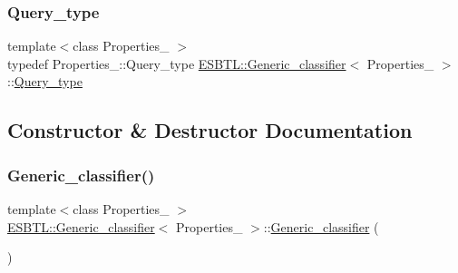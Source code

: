 \mbox{\label{structESBTL_1_1Generic__classifier_af7772b010c028daaec09d6a3f556894d}} 
\subsubsection{\texorpdfstring{Query\+\_\+type}{Query\_type}}
{\footnotesize\ttfamily template$<$class Properties\+\_\+ $>$ \\
typedef Properties\+\_\+\+::\+Query\+\_\+type \hyperlink{structESBTL_1_1Generic__classifier}{E\+S\+B\+T\+L\+::\+Generic\+\_\+classifier}$<$ Properties\+\_\+ $>$\+::\hyperlink{structESBTL_1_1Generic__classifier_af7772b010c028daaec09d6a3f556894d}{Query\+\_\+type}}



\subsection{Constructor \& Destructor Documentation}
\mbox{\label{structESBTL_1_1Generic__classifier_a5d56e509b7af3a5fe94e4e737de4eea8}} 
\subsubsection{\texorpdfstring{Generic\+\_\+classifier()}{Generic\_classifier()}\hspace{0.1cm}{\footnotesize\ttfamily [1/3]}}
{\footnotesize\ttfamily template$<$class Properties\+\_\+ $>$ \\
\hyperlink{structESBTL_1_1Generic__classifier}{E\+S\+B\+T\+L\+::\+Generic\+\_\+classifier}$<$ Properties\+\_\+ $>$\+::\hyperlink{structESBTL_1_1Generic__classifier}{Generic\+\_\+classifier} (\begin{DoxyParamCaption}{ }\end{DoxyParamCaption})\hspace{0.3cm}{\ttfamily [inline]}}

